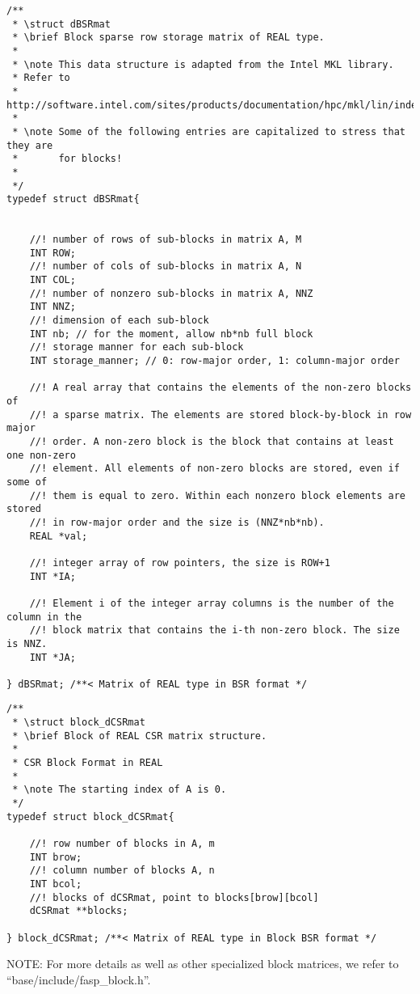 \documentclass[11pt]{memoir}
\begin{document}
\begin{lstlisting}
/** 
 * \struct dBSRmat
 * \brief Block sparse row storage matrix of REAL type.
 *
 * \note This data structure is adapted from the Intel MKL library. 
 * Refer to 
 * http://software.intel.com/sites/products/documentation/hpc/mkl/lin/index.htm
 *
 * \note Some of the following entries are capitalized to stress that they are 
 *       for blocks!
 *
 */
typedef struct dBSRmat{
	
    
	//! number of rows of sub-blocks in matrix A, M
	INT ROW;
	//! number of cols of sub-blocks in matrix A, N
	INT COL;
	//! number of nonzero sub-blocks in matrix A, NNZ
	INT NNZ;
	//! dimension of each sub-block
	INT nb; // for the moment, allow nb*nb full block 
	//! storage manner for each sub-block           
	INT storage_manner; // 0: row-major order, 1: column-major order
	
	//! A real array that contains the elements of the non-zero blocks of 
	//! a sparse matrix. The elements are stored block-by-block in row major 
	//! order. A non-zero block is the block that contains at least one non-zero 
	//! element. All elements of non-zero blocks are stored, even if some of 
	//! them is equal to zero. Within each nonzero block elements are stored 
	//! in row-major order and the size is (NNZ*nb*nb). 
	REAL *val;
	
	//! integer array of row pointers, the size is ROW+1
	INT *IA;
	
	//! Element i of the integer array columns is the number of the column in the
	//! block matrix that contains the i-th non-zero block. The size is NNZ.
	INT *JA;
	
} dBSRmat; /**< Matrix of REAL type in BSR format */
\end{lstlisting}
%
\begin{lstlisting}
/** 
 * \struct block_dCSRmat
 * \brief Block of REAL CSR matrix structure.
 *
 * CSR Block Format in REAL
 *
 * \note The starting index of A is 0.  
 */
typedef struct block_dCSRmat{
	
	//! row number of blocks in A, m
	INT brow;   
	//! column number of blocks A, n
	INT bcol;   
	//! blocks of dCSRmat, point to blocks[brow][bcol]
	dCSRmat **blocks;
	
} block_dCSRmat; /**< Matrix of REAL type in Block BSR format */
\end{lstlisting}
%

\begin{snugshade}\noindent
NOTE: For more details as well as other specialized block matrices, we refer to ``base/include/fasp\_block.h''.
\end{snugshade}
\end{document}
